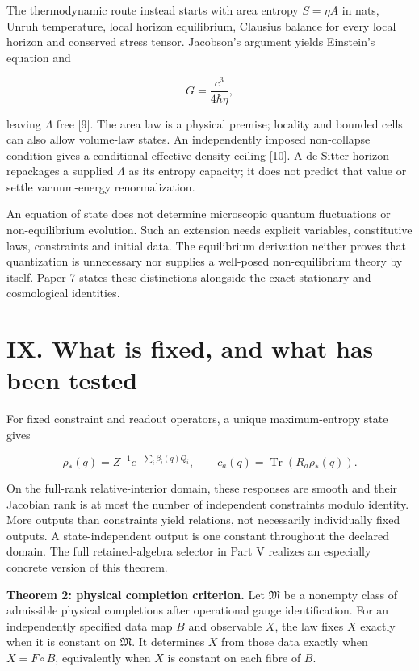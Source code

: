 \documentclass[
  11pt,
  a4paper,
]{article}
\newcounter{none} %
\begin{document}
The thermodynamic route instead starts with area entropy \(S=\eta A\) in nats, Unruh temperature, local horizon equilibrium, Clausius balance for every local horizon and conserved stress tensor. Jacobson's argument yields Einstein's equation and

\[G=\frac{c^3}{4\hbar\eta},\]

leaving \(\Lambda\) free {[}9{]}. The area law is a physical premise; locality and bounded cells can also allow volume-law states. An independently imposed non-collapse condition gives a conditional effective density ceiling {[}10{]}. A de Sitter horizon repackages a supplied \(\Lambda\) as its entropy capacity; it does not predict that value or settle vacuum-energy renormalization.

An equation of state does not determine microscopic quantum fluctuations or non-equilibrium evolution. Such an extension needs explicit variables, constitutive laws, constraints and initial data. The equilibrium derivation neither proves that quantization is unnecessary nor supplies a well-posed non-equilibrium theory by itself. Paper 7 states these distinctions alongside the exact stationary and cosmological identities.

\section{IX. What is fixed, and what has been tested}\label{ix.-what-is-fixed-and-what-has-been-tested}

For fixed constraint and readout operators, a unique maximum-entropy state gives

\[\rho_*(q)=Z^{-1}e^{-\sum_i\beta_i(q)Q_i},\qquad
c_a(q)=\operatorname{Tr}(R_a\rho_*(q)).\]

On the full-rank relative-interior domain, these responses are smooth and their Jacobian rank is at most the number of independent constraints modulo identity. More outputs than constraints yield relations, not necessarily individually fixed outputs. A state-independent output is one constant throughout the declared domain. The full retained-algebra selector in Part V realizes an especially concrete version of this theorem.

\textbf{Theorem 2: physical completion criterion.} Let \(\mathfrak M\) be a nonempty class of admissible physical completions after operational gauge identification. For an independently specified data map \(B\) and observable \(X\), the law fixes \(X\) exactly when it is constant on \(\mathfrak M\). It determines \(X\) from those data exactly when \(X=F\circ B\), equivalently when \(X\) is constant on each fibre of \(B\).
\end{document}
